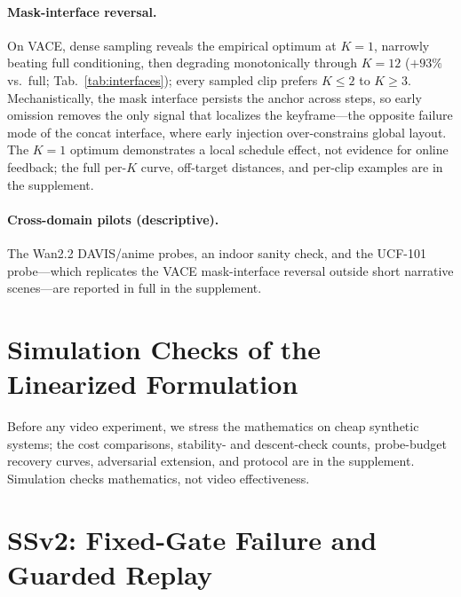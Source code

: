 \documentclass[letterpaper]{article}
\begin{document}
\paragraph{Mask-interface reversal.}
On VACE, dense sampling reveals the empirical optimum at $K{=}1$, narrowly
beating full conditioning, then degrading monotonically through $K{=}12$
($+93\%$ vs.\ full; Tab.~\ref{tab:interfaces}); every sampled clip prefers
$K{\le}2$ to $K{\ge}3$. Mechanistically, the mask interface persists the
anchor across steps, so early omission removes the only signal that
localizes the keyframe---the opposite failure mode of the concat
interface, where early injection over-constrains global layout. The
$K{=}1$ optimum demonstrates a local schedule effect, not evidence for
online feedback; the full per-$K$ curve, off-target distances, and
per-clip examples are in the supplement.

\paragraph{Cross-domain pilots (descriptive).}
The Wan2.2 DAVIS/anime probes, an indoor sanity check, and the UCF-101
probe---which replicates the VACE mask-interface reversal outside short
narrative scenes---are reported in full in the supplement.

\section{Simulation Checks of the Linearized Formulation}
\label{sec:sim}
Before any video experiment, we stress the mathematics on cheap synthetic
systems; the cost comparisons, stability- and descent-check counts,
probe-budget recovery curves, adversarial extension, and protocol are in
the supplement. Simulation checks mathematics, not video effectiveness.

\section{SSv2: Fixed-Gate Failure and Guarded Replay}
\label{sec:protocol}
\end{document}
